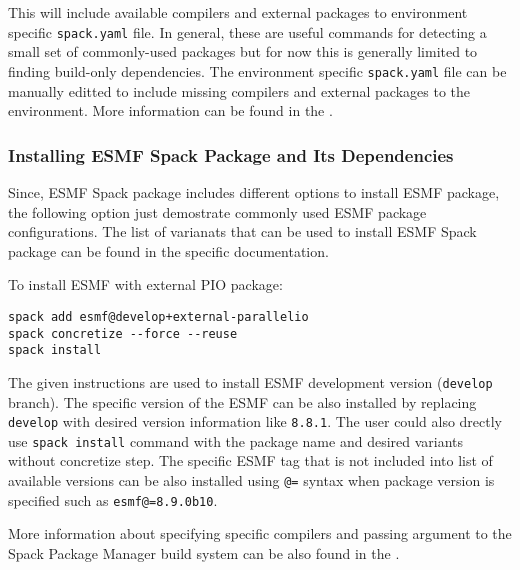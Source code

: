 This will include available compilers and external packages to environment specific {\tt spack.yaml} file. In general, these are useful commands for detecting a small set of commonly-used packages but for now this is generally limited to finding build-only dependencies. The environment specific {\tt spack.yaml} file can be manually editted to include missing compilers and external packages to the environment. More information can be found in the .

\subsubsection{Installing ESMF Spack Package and Its Dependencies}

Since, ESMF Spack package includes different options to install ESMF package, the following option just demostrate commonly used ESMF package configurations. The list of varianats that can be used to install ESMF Spack package can be found in the  specific documentation.

To install ESMF with external PIO package:

\begin{verbatim}
spack add esmf@develop+external-parallelio
spack concretize --force --reuse
spack install
\end{verbatim}

The given instructions are used to install ESMF development version ({\tt develop} branch). The specific version of the ESMF can be also installed by replacing {\tt develop} with desired version information like {\tt 8.8.1}. The user could also drectly use {\tt spack install} command with the package name and desired variants without concretize step. The specific ESMF tag that is not included into list of available versions can be also installed using {\tt @=} syntax when package version is specified such as {\tt esmf@=8.9.0b10}.

More information about specifying specific compilers and passing argument to the Spack Package Manager build system can be also found in the .
